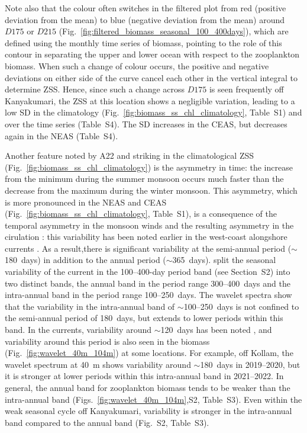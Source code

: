 \documentclass[authoryear,review,11pt]{elsarticle}
\begin{document}
Note also that the colour often switches in the filtered plot from red (positive deviation from the mean) to blue (negative deviation from the mean) around $D175$ or $D215$ (Fig.~\ref{fig:filtered_biomass_seasonal_100_400days}), which are defined using the monthly time series of biomass, pointing to the role of this contour in separating the upper and lower ocean with respect to the zooplankton biomass.  When such a change of colour occurs, the positive and negative deviations on either side of the curve cancel each other in the vertical integral to determine ZSS.  Hence, since such a change across $D175$ is seen frequently off Kanyakumari, the ZSS at this location shows a negligible variation, leading to a low SD in the climatology (Fig.~\ref{fig:biomass_ss_chl_climatology}, Table~S1) and over the time series (Table~S4).  The SD increases in the CEAS, but decreases again in the NEAS (Table~S4).

Another feature noted by A22 and striking in the climatological ZSS (Fig.~\ref{fig:biomass_ss_chl_climatology}) is the asymmetry in time: the increase from the minimum during the summer monsoon occurs much faster than the decrease from the maximum during the winter monsoon. This asymmetry, which is more pronounced in the NEAS and CEAS (Fig.~\ref{fig:biomass_ss_chl_climatology}, Table~S1), is a consequence of the temporal asymmetry in the monsoon winds and the resulting asymmetry in the cirulation \citep[see, for example,][]{shankar2002monsoon, shankar2019role}: this variability has been noted earlier in the west-coast alongshore currents \citep{amol2014observed, chaudhuri2020observed}. As a result,there is significant variability at the semi-annual period ($\sim$180~days) in addition to the annual period ($\sim$365~days).  \citet{amol2014observed} split the seasonal variability of the current in the 100--400-day period band (see Section~S2) into two distinct bands, the annual band in the period range 300--400~days and the intra-annual band in the period range 100--250~days.  The wavelet spectra show that the variability in the intra-annual band of $\sim$100--250~days is not confined to the semi-annual period of 180~days, but extends to lower periods within this band.  In the currents, variability around $\sim$120~days has been noted \citep{amol2014observed, chaudhuri2020observed}, and variability around this period is also seen in the biomass (Fig.~\ref{fig:wavelet_40m_104m}) at some locations.  For example, off Kollam, the wavelet spectrum at 40~m shows variability around $\sim$180~days in 2019--2020, but it is stronger at lower periods within this intra-annual band in 2021--2022.  In general, the annual band for zooplankton biomass tends to be weaker than the intra-annual band (Figs.~\ref{fig:wavelet_40m_104m},S2, Table~S3).  Even within the weak seasonal cycle off Kanyakumari, variability is stronger in the intra-annual band compared to the annual band (Fig.~S2, Table~S3).
\end{document}
